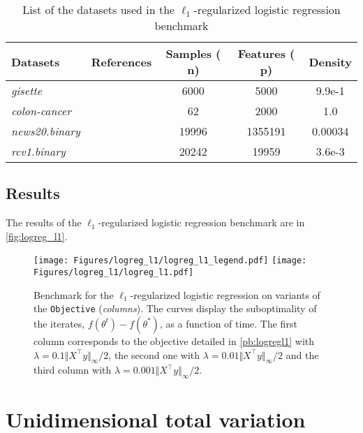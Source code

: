 \documentclass{article}
\newlength{\figwidth}
\begin{document}
\begin{table}[h]
  \centering
  \caption{List of the datasets used in the $\ell_1$-regularized logistic regression benchmark}
      \begin{tabular}{llS[table-format=8.0]S[table-format=7.0]S[table-format=1.1e-1,scientific-notation=true]}
        \toprule
        \textbf{Datasets} & \textbf{References} &{\textbf{Samples ($\mathbf{n}$)}} & {\textbf{Features ($\mathbf{p}$)}} & {\textbf{Density}} \\
        \midrule
        \emph{gisette} & \citet{madelon} & 6000 & 5000 & 9.9e-1 \\
        \emph{colon-cancer} & \cite{madelon} & 62 & 2000 & 1.0 \\
        \emph{news20.binary} &\citet{news20} & 19996 & 1355191 & 0.00034 \\
        \emph{rcv1.binary} &\cite{madelon} & 20242 & 19959 & 3.6e-3 \\
        \bottomrule
    \end{tabular}
    \label{table:summary_data_logreg_l1}
\end{table}

\subsection{Results}

The results of the $\ell_1$-regularized logistic regression benchmark are in \autoref{fig:logreg_l1}.

\begin{figure}[t]
    \centering
    \texttt{[image: Figures/logreg\_l1/logreg\_l1\_legend.pdf]}
    \texttt{[image: Figures/logreg\_l1/logreg\_l1.pdf]}
    \caption{
        Benchmark for the $\ell_1$-regularized logistic regression on variants of the \texttt{Objective} (\emph{columns}).
        The curves display the suboptimality of the iterates, $f(\theta^t) - f(\theta^*)$, as a function of time.
        The first column corresponds to the objective detailed in \autoref{pb:logregl1} with $\lambda = 0.1  \Vert X^\top y\Vert_\infty / 2$, the second one with $\lambda = 0.01 \Vert X^\top y\Vert_\infty / 2$ and the third column with $\lambda=0.001  \Vert X^\top y\Vert_\infty / 2$.
    }
    \label{fig:logreg_l1}
\end{figure}\clearpage{}

\clearpage{}\section{Unidimensional total variation}\label{sec:app:tv1d}
\end{document}
